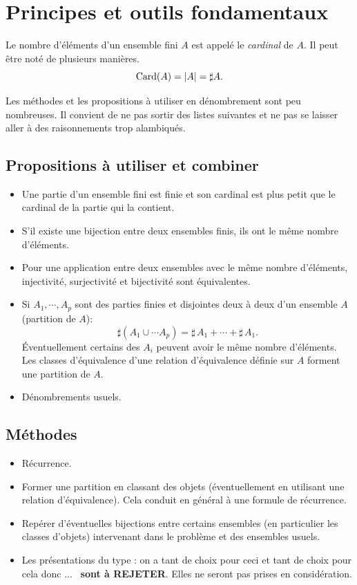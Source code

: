 %


\section{Principes et outils fondamentaux}
\begin{nota}
 Le nombre d'éléments d'un ensemble fini $A$ est appelé le \emph{cardinal} de $A$. Il peut être noté de plusieurs manières.
\[
 \mathop{\mathrm{Card}}(A) = |A| = \sharp A.
\]
\end{nota}
Les méthodes et les propositions à utiliser en dénombrement sont peu nombreuses. Il convient de ne pas sortir des listes suivantes et ne pas se laisser aller à des raisonnements trop alambiqués.
\clearpage
\subsection{Propositions à utiliser et combiner}
\begin{itemize}
 \item Une partie d'un ensemble fini est finie et son cardinal est plus petit que le cardinal de la partie qui la contient.
 \item S'il existe une bijection entre deux ensembles finis, ils ont le même nombre d'éléments.
 \item Pour une application entre deux ensembles avec le même nombre d'éléments, injectivité, surjectivité et bijectivité sont équivalentes.
 \item Si $A_1,\cdots,A_p$ sont des parties finies et disjointes deux à deux d'un ensemble $A$ (partition de $A$):
\begin{displaymath}
 \sharp\left(A_1 \cup \cdots A_p \right) = \sharp\, A_1 + \cdots + \sharp\, A_1. 
\end{displaymath}
\'Eventuellement certains des $A_i$ peuvent avoir le même nombre d'éléments. Les classes d'équivalence d'une relation d'équivalence définie sur $A$ forment une partition de $A$.
\item Dénombrements usuels.
\end{itemize}

\subsection{Méthodes}
\begin{itemize}
 \item Récurrence.
 \item Former une partition en classant des objets (éventuellement en utilisant une relation d'équivalence). Cela conduit en général à une formule de récurrence.
 \item Repérer d'éventuelles bijections entre certains ensembles (en particulier les classes d'objets) intervenant dans le problème et des ensembles usuels.
 \item Les présentations du type : \og on a tant de choix pour ceci et tant de choix pour cela donc ...\fg~ \textbf{sont à REJETER}. Elles ne seront pas prises en considération.
\end{itemize}
\clearpage
